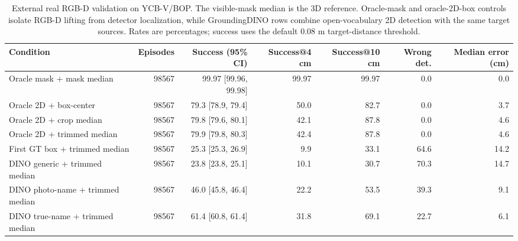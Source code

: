 \begin{table}[t]
\centering
\caption{External real RGB-D validation on YCB-V/BOP. The visible-mask median is the 3D reference. Oracle-mask and oracle-2D-box controls isolate RGB-D lifting from detector localization, while GroundingDINO rows combine open-vocabulary 2D detection with the same target sources. Rates are percentages; success uses the default 0.08 m target-distance threshold.}
\label{tab:external-rgbd-validation}
\scriptsize
\begin{tabular}{lrrrrrr}
\toprule
Condition & Episodes & Success (95\% CI) & Success@4 cm & Success@10 cm & Wrong det. & Median error (cm) \\
\midrule
Oracle mask + mask median & 98567 & 99.97 [99.96, 99.98] & 99.97 & 99.97 & 0.0 & 0.0 \\
Oracle 2D + box-center & 98567 & 79.3 [78.9, 79.4] & 50.0 & 82.7 & 0.0 & 3.7 \\
Oracle 2D + crop median & 98567 & 79.8 [79.6, 80.1] & 42.1 & 87.8 & 0.0 & 4.6 \\
Oracle 2D + trimmed median & 98567 & 79.9 [79.8, 80.3] & 42.4 & 87.8 & 0.0 & 4.6 \\
First GT box + trimmed median & 98567 & 25.3 [25.3, 26.9] & 9.9 & 33.1 & 64.6 & 14.2 \\
DINO generic + trimmed median & 98567 & 23.8 [23.8, 25.1] & 10.1 & 30.7 & 70.3 & 14.7 \\
DINO photo-name + trimmed median & 98567 & 46.0 [45.8, 46.4] & 22.2 & 53.5 & 39.3 & 9.1 \\
DINO true-name + trimmed median & 98567 & 61.4 [60.8, 61.4] & 31.8 & 69.1 & 22.7 & 6.1 \\
\bottomrule
\end{tabular}
\end{table}
